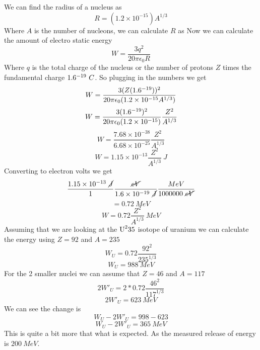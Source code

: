 \documentclass[11pt]{article}
\numberwithin{equation}{section}
\begin{document}
\begin{enumerate}[(a)]
\begin{enumerate}[(i)]
We can find the radius of a nucleus as
$$R = (1.2\times10^{-15})A^{1/3}$$
Where $A$ is the number of nucleons, we can calculate $R$ as
Now we can calculate the amount of electro static energy 
$$W = \frac{3q^2}{20\pi\epsilon_0R}$$
Where $q$ is the total charge of the nucleus or the number of protons $Z$ times the fundamental charge $1.6\time10^{-19}\ C$.
So plugging in the numbers we get
$$W = \frac{3(Z(1.6\time10^{-19}))^2}{20\pi\epsilon_0(1.2\times10^{-15} A^{1/3})}$$
$$W = \frac{3(1.6\time10^{-19})^2}{20\pi\epsilon_0(1.2\times10^{-15})}\frac{Z^2}{A^{1/3}}$$
$$W = \frac{7.68\times10^{-38}}{6.68\times10^{-25}}\frac{Z^2}{A^{1/3}}$$
$$W = 1.15\times10^{-13}\frac{Z^2}{A^{1/3}}\ J$$
Converting to electron volts we get
$$\frac{1.15\times10^{-13}\ \cancel{J}}{1}\frac{\cancel{eV}}{1.6\times10^{-19}\ \cancel{J}}\frac{ MeV}{1000000\ \cancel{eV}}$$
$$ = 0.72\ MeV$$
$$W = 0.72\frac{Z^2}{A^{1/3}}\ MeV$$
Assuming that we are looking at the $\textnormal{U}^235$ isotope of uranium we can calculate the energy using $Z=92$ and $A=235$
$$W_U=0.72\frac{92^2}{235^{1/3}}$$
$$W_U=988\ MeV$$
For the 2 smaller nuclei we can assume that $Z=46$ and $A=117$
$$2W'_U = 2*0.72\frac{46^2}{117^{1/3}}$$
$$2W'_U = 623\ MeV$$
We can see the change is
$$W_U - 2W'_U = 998 - 623$$
$$W_U - 2W'_U = 365\ MeV$$
This is quite a bit more that what is expected. As the measured release of energy is $200\ MeV$.

\end{enumerate}
\end{enumerate}
\end{document}
